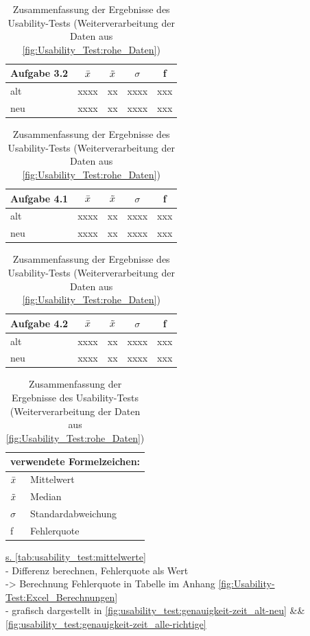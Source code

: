 \begin{table}[H]
\begin{tabular}{|l|c|c|c|c|}
\hline
Aufgabe 3.2   & $\Bar{x}$ & $\Tilde{x}$ & $\sigma$ & f \\ \hline
alt         & xxxx      &  xx         &  xxxx &  xxx   \\ \hline
neu         & xxxx      &  xx         &  xxxx &  xxx   \\ \hline
\end{tabular}
\begin{tabular}{|l|c|c|c|c|}
\hline
Aufgabe 4.1   & $\Bar{x}$ & $\Tilde{x}$ & $\sigma$ & f \\ \hline
alt         & xxxx      &  xx         &  xxxx &  xxx   \\ \hline
neu         & xxxx      &  xx         &  xxxx &  xxx   \\ \hline
\end{tabular}
\begin{tabular}{|l|c|c|c|c|}
\hline
Aufgabe 4.2   & $\Bar{x}$ & $\Tilde{x}$ & $\sigma$ & f \\ \hline
alt         & xxxx      &  xx         &  xxxx &  xxx   \\ \hline
neu         & xxxx      &  xx         &  xxxx &  xxx   \\ \hline
\end{tabular}
\begin{tabular}{ll}
\multicolumn{2}{l}{verwendete Formelzeichen:} \\ \hline
$\Bar{x}$          & Mittelwert               \\
$\Tilde{x}$        & Median                   \\
$\sigma$           & Standardabweichung       \\
f                  & Fehlerquote
\end{tabular}
\caption{Zusammenfassung der Ergebnisse des Usability-Tests (Weiterverarbeitung der Daten aus \autoref{fig:Usability_Test:rohe_Daten})}
\label{tab:usability_test:mittelwerte}
\end{table}
\underline{s. \autoref{tab:usability_test:mittelwerte}}\\
- Differenz berechnen, Fehlerquote als Wert\\
-> Berechnung Fehlerquote in Tabelle im Anhang \autoref{fig:Usability-Test:Excel_Berechnungen}\\
- grafisch dargestellt in \autoref{fig:usability_test:genauigkeit-zeit_alt-neu} \&\& \autoref{fig:usability_test:genauigkeit-zeit_alle-richtige}

